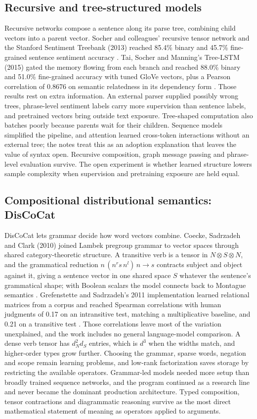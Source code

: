 \subsection{Recursive and tree-structured models}
Recursive networks compose a sentence along its parse tree, combining child vectors into a parent vector. Socher and colleagues' recursive tensor network and the Stanford Sentiment Treebank (2013) reached 85.4\% binary and 45.7\% fine-grained sentence sentiment accuracy \cite{pre23}. Tai, Socher and Manning's Tree-LSTM (2015) gated the memory flowing from each branch and reached 88.0\% binary and 51.0\% fine-grained accuracy with tuned GloVe vectors, plus a Pearson correlation of 0.8676 on semantic relatedness in its dependency form \cite{pre24}. Those results rest on extra information. An external parser supplied possibly wrong trees, phrase-level sentiment labels carry more supervision than sentence labels, and pretrained vectors bring outside text exposure. Tree-shaped computation also batches poorly because parents wait for their children. Sequence models simplified the pipeline, and attention learned cross-token interactions without an external tree; the notes treat this as an adoption explanation that leaves the value of syntax open. Recursive composition, graph message passing and phrase-level evaluation survive. The open experiment is whether learned structure lowers sample complexity when supervision and pretraining exposure are held equal.

\subsection{Compositional distributional semantics: DisCoCat}
DisCoCat lets grammar decide how word vectors combine. Coecke, Sadrzadeh and Clark (2010) joined Lambek pregroup grammar to vector spaces through shared category-theoretic structure. A transitive verb is a tensor in $N\otimes S\otimes N$, and the grammatical reduction $n\,(n^r s\, n^l)\,n \to s$ contracts subject and object against it, giving a sentence vector in one shared space $S$ whatever the sentence's grammatical shape; with Boolean scalars the model connects back to Montague semantics \cite{pre25}. Grefenstette and Sadrzadeh's 2011 implementation learned relational matrices from a corpus and reached Spearman correlations with human judgments of 0.17 on an intransitive test, matching a multiplicative baseline, and 0.21 on a transitive test \cite{pre26}. Those correlations leave most of the variation unexplained, and the work includes no general language-model comparison. A dense verb tensor has $d_N^2 d_S$ entries, which is $d^3$ when the widths match, and higher-order types grow further. Choosing the grammar, sparse words, negation and scope remain learning problems, and low-rank factorization saves storage by restricting the available operators. Grammar-led models needed more setup than broadly trained sequence networks, and the program continued as a research line and never became the dominant production architecture. Typed composition, tensor contractions and diagrammatic reasoning survive as the most direct mathematical statement of meaning as operators applied to arguments.

